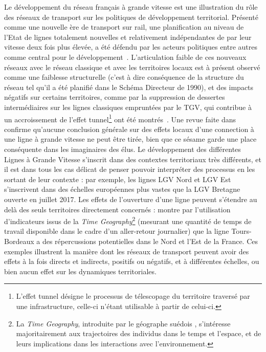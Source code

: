 {Le développement du réseau français à grande vitesse est une illustration du rôle des réseaux de transport sur les politiques de développement territorial. Présenté comme une nouvelle ère de transport sur rail, une planification au niveau de l'Etat de lignes totalement nouvelles et relativement indépendantes de par leur vitesse deux fois plus élevée, a été défendu par les acteurs politiques entre autres comme central pour le développement~\cite{zembri1997fondements}. L'articulation faible de ces nouveaux réseaux avec le réseau classique et avec les territoires locaux est à présent observé comme une faiblesse structurelle (c'est à dire conséquence de la structure du réseau tel qu'il a été planifié dans le Schéma Directeur de 1990), et des impacts négatifs sur certains territoires, comme par la suppression de dessertes intermédiaires sur les lignes classiques empruntées par le TGV, qui contribue à un accroissement de l'effet tunnel\footnote{L'effet tunnel désigne le processus de télescopage du territoire traversé par une infrastructure, celle-ci n'étant utilisable à partir de celui-ci.} ont été montrés~\cite{zembri2008contribution}. Une revue faite dans~\cite{bazin2011grande} confirme qu'aucune conclusion générale sur des effets locaux d'une connection à une ligne à grande vitesse ne peut être tirée, bien que ce sésame garde une place conséquente dans les imaginaires des élus. Le développement des différentes Lignes à Grande Vitesse s'inscrit dans des contextes territoriaux très différents, et il est dans tous les cas délicat de penser pouvoir interpréter des processus en les sortant de leur contexte : par exemple, les lignes LGV Nord et LGV Est s'inscrivent dans des échelles européennes plus vastes que la LGV Bretagne ouverte en juillet 2017. Les effets de l'ouverture d'une ligne peuvent s'étendre au delà des seuls territoires directement concernés : \cite{l2014contribution} montre par l'utilisation d'indicateurs issus de la \emph{Time Geography}\footnote{La \emph{Time Geography}, introduite par le géographe suédois , s'intéresse majoritairement aux trajectoires des individus dans le temps et l'espace, et de leurs implications dans les interactions avec l'environnement.} (mesurant une quantité de temps de travail disponible dans le cadre d'un aller-retour journalier) que la ligne Tours-Bordeaux a des répercussions potentielles dans le Nord et l'Est de la France. Ces exemples illustrent la manière dont les réseaux de transport peuvent avoir des effets à la fois directs et indirects, positifs ou négatifs, et à différentes échelles, ou bien aucun effet sur les dynamiques territoriales.
}





